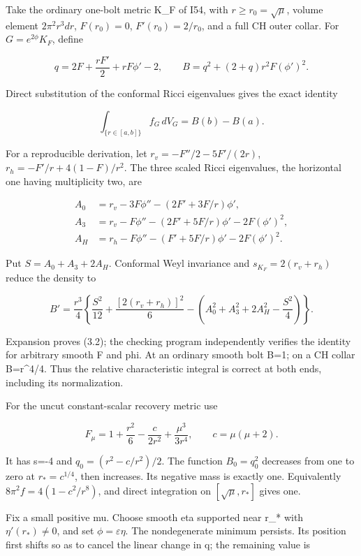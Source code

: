 \documentclass[
  10pt,
]{article}
\begin{document}
Take the ordinary one-bolt metric K\_F of I54, with
\(r\ge r_0=\sqrt\mu\), volume element \(2\pi^2r^3dr\), \(F(r_0)=0\),
\(F'(r_0)=2/r_0\), and a full CH outer collar. For \(G=e^{2\phi}K_F\),
define

\[
 q=2F+\frac{rF'}2+rF\phi'-2,\qquad
 B=q^2+(2+q)r^2F(\phi')^2.
 \tag{3.1}
\]

Direct substitution of the conformal Ricci eigenvalues gives the exact
identity

\[
 \boxed{\int_{\{r\in[a,b]\}} f_G\,dV_G=B(b)-B(a).} \tag{3.2}
\]

For a reproducible derivation, let \(r_v=-F''/2-5F'/(2r)\),
\(r_h=-F'/r+4(1-F)/r^2\). The three scaled Ricci eigenvalues, the
horizontal one having multiplicity two, are

\[
\begin{aligned}
 A_0&=r_v-3F\phi''-(2F'+3F/r)\phi',\\
 A_3&=r_v-F\phi''-(2F'+5F/r)\phi'-2F(\phi')^2,\\
 A_H&=r_h-F\phi''-(F'+5F/r)\phi'-2F(\phi')^2.
\end{aligned}
\]

Put \(S=A_0+A_3+2A_H\). Conformal Weyl invariance and
\(s_{K_F}=2(r_v+r_h)\) reduce the density to

\[
 B'=\frac{r^3}{4}\left\{\frac{S^2}{12}
 +\frac{[2(r_v+r_h)]^2}{6}
 -\left(A_0^2+A_3^2+2A_H^2-\frac{S^2}{4}\right)\right\}.
 \tag{3.3}
\]

Expansion proves (3.2); the checking program independently verifies the
identity for arbitrary smooth F and phi. At an ordinary smooth bolt B=1;
on a CH collar B=r\^{}4/4. Thus the relative characteristic integral is
correct at both ends, including its normalization.

For the uncut constant-scalar recovery metric use

\[
 F_\mu=1+\frac{r^2}{6}-\frac{c}{2r^2}+\frac{\mu^3}{3r^4},
 \qquad c=\mu(\mu+2).
\]

It has s=-4 and \(q_0=(r^2-c/r^2)/2\). The function \(B_0=q_0^2\)
decreases from one to zero at \(r_*=c^{1/4}\), then increases. Its
negative mass is exactly one. Equivalently \(8\pi^2f=4(1-c^2/r^8)\), and
direct integration on \([\sqrt\mu,r_*]\) gives one.

Fix a small positive mu. Choose smooth eta supported near r\_* with
\(\eta'(r_*)\ne0\), and set \(\phi=\varepsilon\eta\). The nondegenerate
minimum persists. Its position first shifts so as to cancel the linear
change in q; the remaining value is
\end{document}
